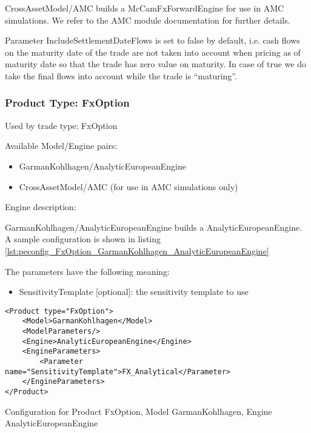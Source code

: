 CrossAssetModel/AMC builds a McCamFxForwardEngine for use in AMC simulations. We refer to the AMC module documentation
for further details.

Parameter IncludeSettlementDateFlows is set to false by default, i.e. cash flows on the maturity date of the trade are
not taken into account when pricing as of maturity date so that the trade has zero value on maturity. In case of true
we do take the final flows into account while the trade is ``maturing''.

\subsubsection{Product Type: FxOption}

Used by trade type: FxOption

Available Model/Engine pairs:

\begin{itemize}
\item GarmanKohlhagen/AnalyticEuropeanEngine
\item CrossAssetModel/AMC (for use in AMC simulations only)
\end{itemize}

Engine description:

GarmanKohlhagen/AnalyticEuropeanEngine builds a AnalyticEuropeanEngine. A sample configuration is shown in listing
\ref{lst:peconfig_FxOption_GarmanKohlhagen_AnalyticEuropeanEngine}

The parameters have the following meaning:

\begin{itemize}
\item SensitivityTemplate [optional]: the sensitivity template to use 
\end{itemize}

\begin{longlisting}
\begin{verbatim}
<Product type="FxOption">
    <Model>GarmanKohlhagen</Model>
    <ModelParameters/>
    <Engine>AnalyticEuropeanEngine</Engine>
    <EngineParameters>
        <Parameter name="SensitivityTemplate">FX_Analytical</Parameter>
    </EngineParameters>
</Product>
\end{verbatim}
\caption{Configuration for Product FxOption, Model GarmanKohlhagen, Engine AnalyticEuropeanEngine}
\label{lst:peconfig_FxOption_GarmanKohlhagen_AnalyticEuropeanEngine}
\end{longlisting}

